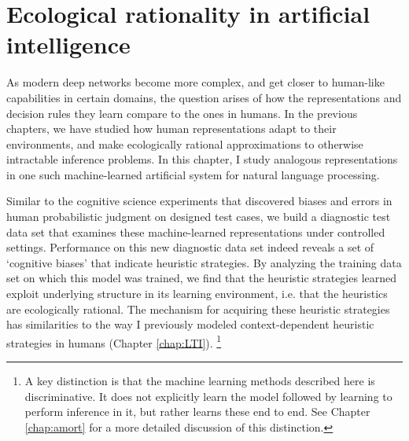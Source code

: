 \chapter{Ecological rationality in artificial intelligence}
\label{chap:sentences}

As modern deep networks become more complex, and get closer to human-like capabilities in certain domains, the question arises of how the representations and decision rules they learn compare to the ones in humans. In the previous chapters, we have studied how human representations adapt to their environments, and make ecologically rational approximations to otherwise intractable inference problems. In this chapter, I study analogous representations in one such machine-learned artificial system for natural language processing.\citep{dasgupta2018evaluating} 

Similar to the cognitive science experiments that discovered biases and errors in human probabilistic judgment on designed test cases\cite{tversky, fox1998belief, gigerenzer2011heuristic}, we build a diagnostic test data set that examines these machine-learned representations under controlled settings. Performance on this new diagnostic data set indeed reveals a set of `cognitive biases' that indicate heuristic strategies. By analyzing the training data set on which this model was trained, we find that the heuristic strategies learned exploit underlying structure in its learning environment, i.e. that the heuristics are ecologically rational. The mechanism for acquiring these heuristic strategies has similarities to the way I previously modeled context-dependent heuristic strategies in humans (Chapter \ref{chap:LTI}). \footnote{A key distinction is that the machine learning methods described here is discriminative. It does not explicitly learn the model followed by learning to perform inference in it, but rather learns these end to end. See Chapter \ref{chap:amort} for a more detailed discussion of this distinction.} 


